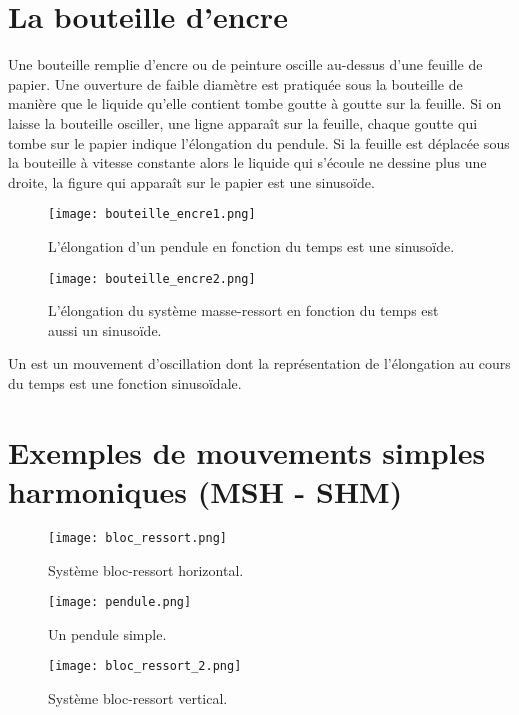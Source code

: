 \newpage

\section{La bouteille d'encre}
Une bouteille remplie d'encre ou de peinture oscille au-dessus d'une feuille de papier. Une ouverture de faible diamètre est pratiquée sous la bouteille de manière que le liquide qu'elle contient tombe goutte à goutte sur la feuille. Si on laisse la bouteille osciller, une ligne apparaît sur la feuille, chaque goutte qui tombe sur le papier indique l'élongation du pendule.
Si la feuille est déplacée sous la bouteille à vitesse constante alors le liquide qui s'écoule ne dessine plus une droite, la figure qui apparaît sur le papier est une sinusoïde.

\begin{figure}[h!]
    \begin{minipage}{.5\textwidth}
        \centering
        \texttt{[image: bouteille\_encre1.png]}
        \caption{L'élongation d'un pendule en fonction du temps est une sinusoïde.}
        \label{bouteille_encre1}
    \end{minipage}
    \begin{minipage}{.5\textwidth}
        \centering
        \texttt{[image: bouteille\_encre2.png]}
        \caption{L'élongation du système masse-ressort en fonction du temps est aussi un sinusoïde.}
        \label{bouteille_encre2}
    \end{minipage}
\end{figure}

\begin{encadre}
    Un  est un mouvement d'oscillation dont la représentation de l'élongation au cours du temps est une fonction sinusoïdale.
\end{encadre}

\newpage

\section{Exemples de mouvements simples harmoniques (MSH - SHM)}
\begin{figure}[h!]
    \centering
    \texttt{[image: bloc\_ressort.png]}
    \caption{Système bloc-ressort horizontal.}
    \label{bloc_ressort}
\end{figure}

\begin{figure}[h!]
    \begin{minipage}{.5\textwidth}
        \centering
        \texttt{[image: pendule.png]}
        \caption{Un pendule simple.}
        \label{pendule}
    \end{minipage}
    \begin{minipage}{.5\textwidth}
        \centering
        \texttt{[image: bloc\_ressort\_2.png]}
        \caption{Système bloc-ressort vertical.}
        \label{bouteille_encre3}
    \end{minipage}
\end{figure}

